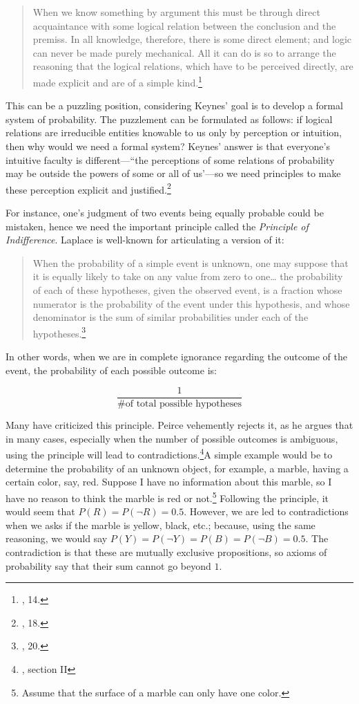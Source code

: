 \begin{quote}
When we know something by argument this must be through direct
acquaintance with some logical relation between the conclusion and the
premiss. In all knowledge, therefore, there is some direct element; and
logic can never be made purely mechanical. All it can do is so to
arrange the reasoning that the logical relations, which have to be
perceived directly, are made explicit and are of a simple
kind.\footnote{\cite{keynes}, 14.}
\end{quote}

This can be a puzzling position, considering Keynes' goal is to develop a
formal system of probability. The puzzlement can be formulated as follows: if logical relations are irreducible entities
knowable to us only by perception or intuition, then why would we need a
formal system? Keynes' answer is that everyone's intuitive faculty is
different---``the perceptions of some relations of probability may be
outside the powers of some or all of us'---so we need principles to make
these perception explicit and justified.\footnote{\cite{keynes}, 18.}

For instance, one's judgment of two events being equally probable could be mistaken, hence we need the important principle called the \emph{Principle of Indifference}. Laplace
is well-known for articulating a version of it:

\begin{quote}
When the probability of a simple event is unknown, one may suppose that
it is equally likely to take on any value from zero to one\ldots{} the
probability of each of these hypotheses, given the observed event, is a
fraction whose numerator is the probability of the event under this hypothesis, and whose denominator is the sum of similar probabilities under each of the hypotheses.\footnote{\cite{laplace}, 20.}
\end{quote}

In other words, when we are in complete ignorance regarding the outcome
of the event, the probability of each possible outcome is:

$$\frac{1}{\text{\# of total possible hypotheses}}$$

Many have criticized this principle. Peirce vehemently
rejects it, as he argues that in many cases, especially when the number
of possible outcomes is ambiguous, using the principle will lead to
contradictions.\footnote{\cite{probabilityofinduction}, section II}A simple example would be to determine the probability of an unknown object, for example, a marble, having a certain color, say, red. Suppose I have no information about this marble, so I have no
reason to think the marble is red or not.\footnote{Assume that the surface
  of a marble can only have one color.} Following the principle, it would
seem that \(P(R) = P(\neg R) = 0.5\). However, we are led to
contradictions when we asks if the marble is yellow, black, etc.; because,
using the same reasoning, we would say
\(P(Y) = P(\neg Y) = P(B) = P(\neg B) = 0.5\). The contradiction is that
these are mutually exclusive propositions, so axioms of probability say
that their sum cannot go beyond \(1\).

